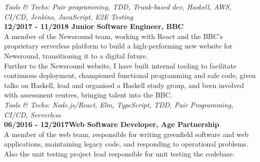 \emph{Tools \& Techs: Pair programming, TDD, Trunk-based dev, Haskell, AWS, CI/CD, Jenkins, JavaScript, E2E Testing}\\

\textbf{12/2017 - 11/2018 \hspace{2.75em}Junior Software Engineer, BBC}\\

A member of the Newsround team, working with React and the BBC's proprietary serverless platform to build a high-performing new website for Newsround, transitioning it to a digital future.\\

Further to the Newsround website, I have built internal tooling to facilitate continuous deployment, championed functional programming and safe code, given talks on Haskell, lead and organised a Haskell study group, and been involved with assessment centres, bringing talent into the BBC.\\

\emph{Tools \& Techs: Node.js/React, Elm, TypeScript, TDD, Pair Programming, CI/CD, Serverless}\\

\textbf{06/2016 - 12/2017\hspace{2.75em}Web Software Developer, Age Partnership}\\

A member of the web team, responsible for writing greenfield software and web applications, maintaining legacy code, and responding to operational problems. Also the unit testing project lead responsible for unit testing the codebase.

